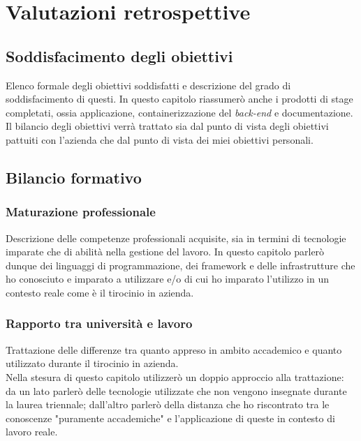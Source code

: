 
\chapter{Valutazioni retrospettive}
\label{cap:valutazioni-retrospettive}

\section{Soddisfacimento degli obiettivi}

Elenco formale degli obiettivi soddisfatti e descrizione del grado di soddisfacimento di questi. In questo capitolo riassumerò anche i prodotti di stage completati, ossia applicazione, containerizzazione del \textit{back-end} e documentazione. \\
Il bilancio degli obiettivi verrà trattato sia dal punto di vista degli obiettivi pattuiti con l'azienda che dal punto di vista dei miei obiettivi personali.


\section{Bilancio formativo}

\subsection{Maturazione professionale}

Descrizione delle competenze professionali acquisite, sia in termini di tecnologie imparate che di abilità nella gestione del lavoro. In questo capitolo parlerò dunque dei linguaggi di programmazione, dei framework e delle infrastrutture che ho conosciuto e imparato a utilizzare e/o di cui ho imparato l'utilizzo in un contesto reale come è il tirocinio in azienda.

\subsection{Rapporto tra università e lavoro}

Trattazione delle differenze tra quanto appreso in ambito accademico e quanto utilizzato durante il tirocinio in azienda. \\
Nella stesura di questo capitolo utilizzerò un doppio approccio alla trattazione: da un lato parlerò delle tecnologie utilizzate che non vengono insegnate durante la laurea triennale; dall'altro parlerò della distanza che ho riscontrato tra le conoscenze "puramente accademiche" e l'applicazione di queste in contesto di lavoro reale.

